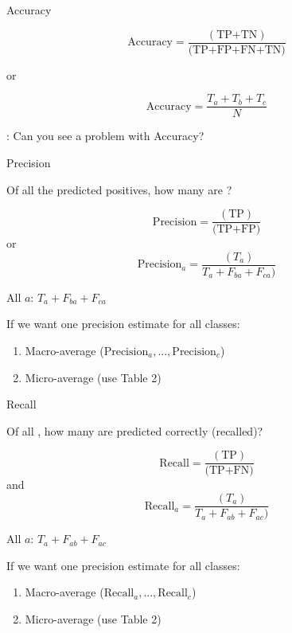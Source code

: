 \documentclass[10pt]{beamer}
\begin{document}
\begin{frame}{Accuracy}


\[
\text{Accuracy} = \frac{(\text{TP+TN})}{\text{(TP+FP+FN+TN)}}
\]

or

\[
\text{Accuracy} = \frac{T_a + T_b + T_c}{N}
\]

\pause


: Can you see a problem with Accuracy?

\end{frame}

\begin{frame}{Precision}

Of all the predicted positives, how many are ?

\[
\text{Precision} = \frac{(\text{TP})}{\text{(TP+FP)}}
\]
or
\[
\text{Precision}_a = \frac{(T_a)}{T_a + F_{ba} + F_{ca})}
\]

All  $a$: $T_a + F_{ba} + F_{ca}$

If we want one precision estimate for all classes:
\begin{enumerate}
\item Macro-average ($\text{Precision}_a, ..., \text{Precision}_c$)
\item Micro-average (use Table 2)
\end{enumerate}

\end{frame}



\begin{frame}{Recall}

Of all , how many are predicted correctly (recalled)?\pause

\[
\text{Recall} = \frac{(\text{TP})}{\text{(TP+FN)}}
\]
and
\[
\text{Recall}_a =  \frac{(T_a)}{T_a + F_{ab} + F_{ac})}
\]

All  $a$: $T_a + F_{ab} + F_{ac}$

If we want one precision estimate for all classes:
\begin{enumerate}
\item Macro-average ($\text{Recall}_a, ..., \text{Recall}_c$)
\item Micro-average (use Table 2)
\end{enumerate}



\end{frame}
\end{document}
